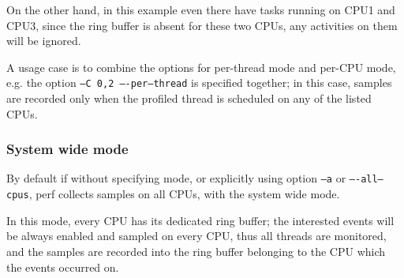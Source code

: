 \documentclass[11pt]{diazessay} %
\def\code#1{\texttt{#1}}
\begin{document}
On the other hand, in this example even there have tasks running on CPU1 and CPU3, since the ring buffer is absent for these two CPUs, any activities on them will be ignored.

A usage case is to combine the options for per-thread mode and per-CPU mode, e.g. the option \code{--C 0,2 ----per--thread} is specified together; in this case, samples are recorded only when the profiled thread is scheduled on any of the listed CPUs.

\subsubsection*{System wide mode}

By default if without specifying mode, or explicitly using option \code{--a} or \code{----all--cpus}, perf collects samples on all CPUs, with the system wide mode.

In this mode, every CPU has its dedicated ring buffer; the interested events will be always enabled and sampled on every CPU, thus all threads are monitored, and the samples are recorded into the ring buffer belonging to the CPU which the events occurred on.
\end{document}
